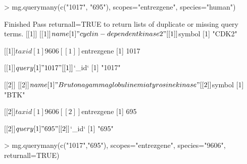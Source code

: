 \documentclass[12pt]{article}
\begin{document}
\begin{Schunk}
\begin{Sinput}
> mg.querymany(c("1017", "695"), scopes="entrezgene", species="human")
\end{Sinput}
\begin{Soutput}
Finished
Pass returnall=TRUE to return lists of duplicate or missing query terms.
[[1]]
[[1]]$name
[1] "cyclin-dependent kinase 2"

[[1]]$symbol
[1] "CDK2"

[[1]]$taxid
[1] 9606

[[1]]$entrezgene
[1] 1017

[[1]]$query
[1] "1017"

[[1]]$`_id`
[1] "1017"


[[2]]
[[2]]$name
[1] "Bruton agammaglobulinemia tyrosine kinase"

[[2]]$symbol
[1] "BTK"

[[2]]$taxid
[1] 9606

[[2]]$entrezgene
[1] 695

[[2]]$query
[1] "695"

[[2]]$`_id`
[1] "695"
\end{Soutput}
\end{Schunk}




\begin{Schunk}
\begin{Sinput}
> mg.querymany(c("1017","695"), scopes="entrezgene", species="9606", returnall=TRUE)
\end{Sinput}
\end{Schunk}
\end{document}
